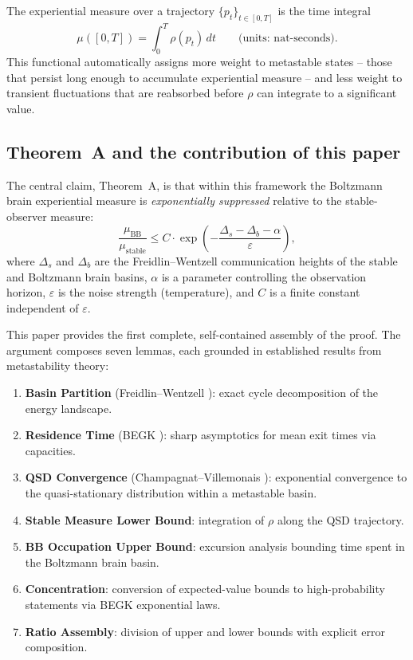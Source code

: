 \documentclass[11pt]{article}
\newcommand{\eps}{\varepsilon}
\newcommand{\Ds}{\Delta_s}
\newcommand{\Db}{\Delta_b}
\begin{document}
The experiential measure over a trajectory $\{p_t\}_{t \in [0,T]}$ is
the time integral
\begin{equation}\label{eq:mu-def}
  \mu([0,T]) = \int_0^T \rho(p_t)\,dt
  \qquad \text{(units: nat-seconds)}.
\end{equation}
This functional automatically assigns more weight to metastable states
-- those that persist long enough to accumulate experiential measure --
and less weight to transient fluctuations that are reabsorbed before
$\rho$ can integrate to a significant value.

\subsection{Theorem~A and the contribution of this paper}

The central claim, Theorem~A, is that within this framework the
Boltzmann brain experiential measure is \emph{exponentially
suppressed} relative to the stable-observer measure:
\[
  \frac{\mu_{\mathrm{BB}}}{\mu_{\mathrm{stable}}}
  \leq C \cdot \exp\!\left(-\frac{\Ds - \Db - \alpha}{\eps}\right),
\]
where $\Ds$ and $\Db$ are the Freidlin--Wentzell communication
heights of the stable and Boltzmann brain basins, $\alpha$ is a
parameter controlling the observation horizon, $\eps$ is the noise
strength (temperature), and $C$ is a finite constant independent
of $\eps$.

This paper provides the first complete, self-contained assembly of
the proof.  The argument composes seven lemmas, each grounded in
established results from metastability theory:
\begin{enumerate}[label=(\roman*)]
\item \textbf{Basin Partition} (Freidlin--Wentzell \cite{FW12}):
  exact cycle decomposition of the energy landscape.
\item \textbf{Residence Time} (BEGK \cite{BEGK02}):
  sharp asymptotics for mean exit times via capacities.
\item \textbf{QSD Convergence} (Champagnat--Villemonais \cite{CV16}):
  exponential convergence to the quasi-stationary distribution within
  a metastable basin.
\item \textbf{Stable Measure Lower Bound}: integration of $\rho$
  along the QSD trajectory.
\item \textbf{BB Occupation Upper Bound}: excursion analysis bounding
  time spent in the Boltzmann brain basin.
\item \textbf{Concentration}: conversion of expected-value bounds to
  high-probability statements via BEGK exponential laws.
\item \textbf{Ratio Assembly}: division of upper and lower bounds
  with explicit error composition.
\end{enumerate}
\end{document}

